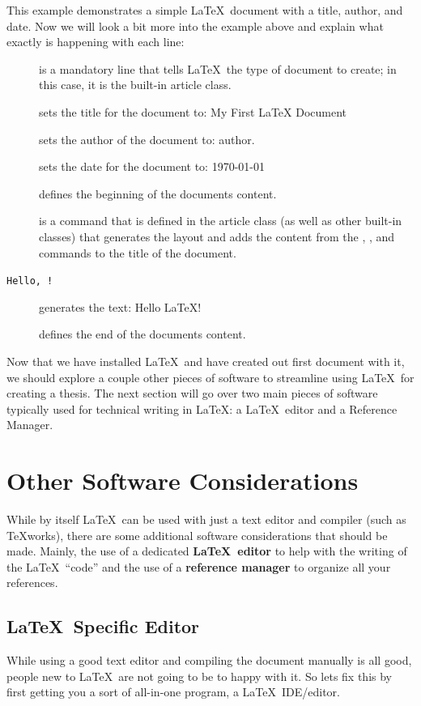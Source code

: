 		This example demonstrates a simple \LaTeX\ document with a title, author, and date.
		Now we will look a bit more into the example above and explain what exactly is happening with each line:

		\begin{description}
			\item[] is a mandatory line that tells \LaTeX\ the type of document to create; in this case, it is the built-in article class.
			\item[] sets the title for the document to: My First \LaTeX{} Document
			\item[\mopt{}] sets the author of the document to: author.
			\item[\mopt{\today}] sets the date for the document to: \today
			\item[] defines the beginning of the documents content.
			\item[] is a command that is defined in the article class (as well as other built-in classes) that generates the layout and adds the content from the , , and  commands to the title of the document.
 			\item[\texttt{Hello, \mopt{}!}] generates the text: Hello \LaTeX!
			\item[] defines the end of the documents content.
		\end{description}

		Now that we have installed \LaTeX\ and have created out first document with it, we should explore a couple other pieces of software to streamline using \LaTeX\ for creating a thesis.
		The next section will go over two main pieces of software typically used for technical writing in \LaTeX: a \LaTeX\ editor and a Reference Manager.

	\section{Other Software Considerations}
		While by itself \LaTeX\ can be used with just a text editor and compiler (such as TeXworks), there are some additional software considerations that should be made.
		Mainly, the use of a dedicated \textbf{\LaTeX\ editor} to help with the writing of the \LaTeX\ \enquote{code} and the use of a \textbf{reference manager} to organize all your references.

		\subsection{\LaTeX\ Specific Editor}
			While using a good text editor and compiling the document manually is all good, people new to \LaTeX\ are not going to be to happy with it.
			So lets fix this by first getting you a sort of all-in-one program, a \LaTeX\ IDE/editor.
	
